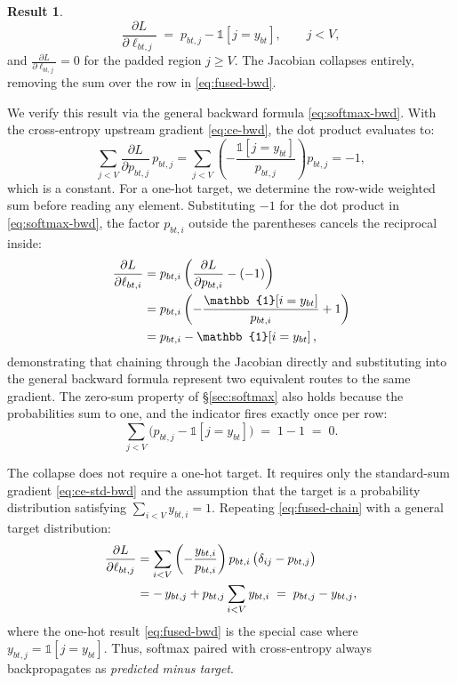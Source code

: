 \documentclass[letterpaper, 10 pt, conference]{ieeeconf}
\newcommand{\pdv}[2]{\frac{\partial #1}{\partial #2}}
\newcommand{\dL}[1]{\pdv{L}{#1}}
\newcommand{\ind}[1]{\mathbb{1}\!\left[#1\right]}
\newcommand{\kron}[2]{\delta_{#1 #2}}
\theoremstyle{definition}
\newtheorem*{result}{Result}
\begin{document}
\begin{result}
  \begin{equation}
    \dL{\ell_{bt,j}} \;=\; p_{bt,j} - \ind{j = y_{bt}},
    \qquad j < V,
    \label{eq:fused-bwd}
  \end{equation}
  and $\dL{\ell_{bt,j}} = 0$ for the padded region $j \geq V$. The Jacobian collapses entirely, removing the sum over the row in \eqref{eq:fused-bwd}.

  We verify this result via the general backward formula \eqref{eq:softmax-bwd}. With the cross-entropy upstream gradient \eqref{eq:ce-bwd}, the dot product evaluates to:
  \begin{equation}
    \sum_{j<V} \dL{p_{bt,j}}\,p_{bt,j}
    = \sum_{j<V} \left(-\frac{\ind{j = y_{bt}}}{p_{bt,j}}\right) p_{bt,j}
    = -1,
    \label{eq:fused-dot}
  \end{equation}
  which is a constant. For a one-hot target, we determine the row-wide weighted sum before reading any element. Substituting $-1$ for the dot product in \eqref{eq:softmax-bwd}, the factor $p_{bt,i}$ outside the parentheses cancels the reciprocal inside:
  \begin{align}
    \dL{\ell_{bt,i}}
     & = p_{bt,i}\left(\dL{p_{bt,i}} - (-1)\right) \notag      \\
     & = p_{bt,i}
    \left(-\frac{\ind{i = y_{bt}}}{p_{bt,i}} + 1\right) \notag \\
     & = p_{bt,i} - \ind{i = y_{bt}},
    \label{eq:fused-check}
  \end{align}
  demonstrating that chaining through the Jacobian directly and substituting into the general backward formula represent two equivalent routes to the same gradient. The zero-sum property of \S\ref{sec:softmax} also holds because the probabilities sum to one, and the indicator fires exactly once per row:
  \begin{equation}
    \sum_{j<V} \bigl(p_{bt,j} - \ind{j = y_{bt}}\bigr)
    \;=\; 1 - 1 \;=\; 0.
    \label{eq:fused-zerosum}
  \end{equation}

  The collapse does not require a one-hot target. It requires only the standard-sum gradient \eqref{eq:ce-std-bwd} and the assumption that the target is a probability distribution satisfying $\sum_{i<V} y_{bt,i} = 1$. Repeating \eqref{eq:fused-chain} with a general target distribution:
  \begin{align}
    \dL{\ell_{bt,j}}
     & = \sum_{i<V}
    \left(-\frac{y_{bt,i}}{p_{bt,i}}\right)
    p_{bt,i}\,\bigl(\kron{i}{j} - p_{bt,j}\bigr) \notag \\
     & = -\,y_{bt,j} + p_{bt,j}\sum_{i<V} y_{bt,i}
    \;=\; p_{bt,j} - y_{bt,j},
    \label{eq:fused-general}
  \end{align}
  where the one-hot result \eqref{eq:fused-bwd} is the special case where $y_{bt,j} = \ind{j = y_{bt}}$. Thus, softmax paired with cross-entropy always backpropagates as \emph{predicted minus target}.
\end{result}
\end{document}
